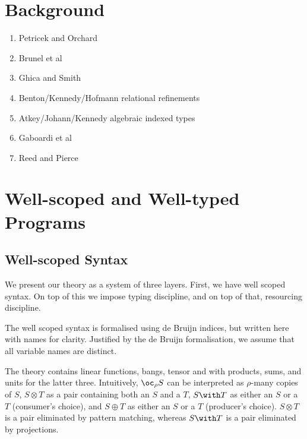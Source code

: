 \documentclass[sigplan,review]{acmart}\settopmatter{printfolios=true,printccs=false,printacmref=false}
\newcommand{\excl}[2]{\oc_{#1} #2}
\newcommand{\tensor}[2]{#1 \otimes #2}
\newcommand{\withT}[2]{#1 \with #2}
\newcommand{\sumT}[2]{#1 \oplus #2}
\begin{document}
\section{Background}

\begin{enumerate}
\item Petricek and Orchard
\item Brunel et al
\item Ghica and Smith
\item Benton/Kennedy/Hofmann relational refinements
\item Atkey/Johann/Kennedy algebraic indexed types
\item Gaboardi et al
\item Reed and Pierce
\end{enumerate}

\section{Well-scoped and Well-typed Programs}

\subsection{Well-scoped Syntax}

We present our theory as a system of three layers. First, we have well scoped
syntax. On top of this we impose typing discipline, and on top of that,
resourcing discipline.

The well scoped syntax is formalised using de Bruijn indices, but written here
with names for clarity. Justified by the de Bruijn formalisation, we assume that
all variable names are distinct.

The theory contains linear functions, bangs, tensor and with products, sums, and
units for the latter three. Intuitively, $\excl{\rho}{S}$ can be interpreted as
$\rho$-many copies of $S$, $\tensor{S}{T}$ as a pair containing both an $S$ and a
$T$, $\withT{S}{T}$ as either an $S$ or a $T$ (consumer's choice), and
$\sumT{S}{T}$ as either an $S$ or a $T$ (producer's choice). $\tensor{S}{T}$ is
a pair eliminated by pattern matching, whereas $\withT{S}{T}$ is a pair
eliminated by projections.
\end{document}
